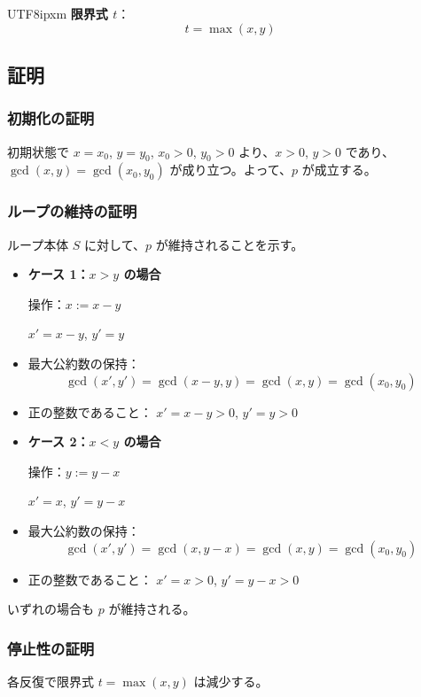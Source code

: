 \documentclass[12pt,a4paper]{article}
\begin{document}
\begin{CJK}{UTF8}{ipxm}
\textbf{限界式 $t$}：
\[
t = \max(x, y)
\]

\subsection*{証明}

\subsubsection*{初期化の証明}

初期状態で $x = x_0$, $y = y_0$, $x_0 > 0$, $y_0 > 0$ より、$x > 0$, $y > 0$ であり、$\gcd(x, y) = \gcd(x_0, y_0)$ が成り立つ。よって、$p$ が成立する。

\subsubsection*{ループの維持の証明}

ループ本体 $S$ に対して、$p$ が維持されることを示す。

\begin{itemize}
    \item \textbf{ケース 1：$x > y$ の場合}

    操作：$x := x - y$

    $x' = x - y$, $y' = y$

    \item 最大公約数の保持：
    \[
    \gcd(x', y') = \gcd(x - y, y) = \gcd(x, y) = \gcd(x_0, y_0)
    \]
    \item 正の整数であること：
    $x' = x - y > 0$, $y' = y > 0$

    \item \textbf{ケース 2：$x < y$ の場合}

    操作：$y := y - x$

    $x' = x$, $y' = y - x$

    \item 最大公約数の保持：
    \[
    \gcd(x', y') = \gcd(x, y - x) = \gcd(x, y) = \gcd(x_0, y_0)
    \]
    \item 正の整数であること：
    $x' = x > 0$, $y' = y - x > 0$
\end{itemize}

いずれの場合も $p$ が維持される。

\subsubsection*{停止性の証明}

各反復で限界式 $t = \max(x, y)$ は減少する。


\end{CJK}
\end{document}
